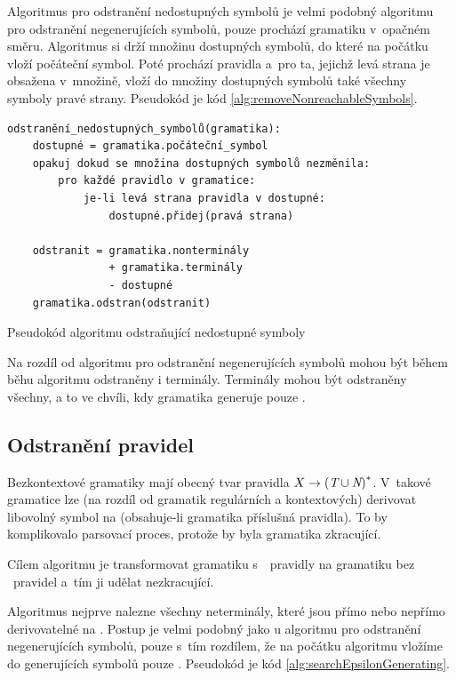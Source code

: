 	Algoritmus pro odstranění nedostupných symbolů je velmi podobný algoritmu pro odstranění negenerujících symbolů, pouze prochází gramatiku v~opačném směru. Algoritmus si drží množinu dostupných symbolů, do které na počátku vloží počáteční symbol. Poté prochází pravidla a~pro ta, jejichž levá strana je obsažena v~množině, vloží do množiny dostupných symbolů také všechny symboly pravé strany. Pseudokód je kód \ref{alg:removeNonreachableSymbols}.
	
	\begin{listing}[h]
		\begin{verbatim}
odstranění_nedostupných_symbolů(gramatika):
	dostupné = gramatika.počáteční_symbol
	opakuj dokud se množina dostupných symbolů nezměnila:
		pro každé pravidlo v gramatice:
			je-li levá strana pravidla v dostupné:
				dostupné.přidej(pravá strana)

	odstranit = gramatika.nonterminály
	            + gramatika.terminály 
	            - dostupné
	gramatika.odstran(odstranit)
		\end{verbatim}
		\caption{Pseudokód algoritmu odstraňující nedostupné symboly}
		\label{alg:removeNonreachableSymbols}
	\end{listing}
	
	Na rozdíl od algoritmu pro odstranění negenerujících symbolů mohou být během běhu algoritmu odstraněny i terminály. Terminály mohou být odstraněny všechny, a to ve chvíli, kdy gramatika generuje pouze \Eps.
	
	\subsection{Odstranění \EpsS pravidel}
	
	Bezkontextové gramatiky mají obecný tvar pravidla $X\rightarrow{(\textit{T}\cup\textit{N})}^{\ast}$. V~takové gramatice lze (na rozdíl od gramatik regulárních a kontextových) derivovat libovolný symbol na \EpsS (obsahuje-li gramatika příslušná pravidla). To by komplikovalo parsovací proces, protože by byla gramatika zkracující.
	
	Cílem algoritmu je transformovat gramatiku s~\Eps~pravidly na gramatiku bez \Eps~pravidel a~tím ji udělat nezkracující.
	
	Algoritmus nejprve nalezne všechny neterminály, které jsou přímo nebo nepřímo derivovatelné na \Eps. Postup je velmi podobný jako u algoritmu pro odstranění negenerujících symbolů, pouze s~tím rozdílem, že na počátku algoritmu vložíme do generujících symbolů pouze \Eps. Pseudokód je kód \ref{alg:searchEpsilonGenerating}.
	
